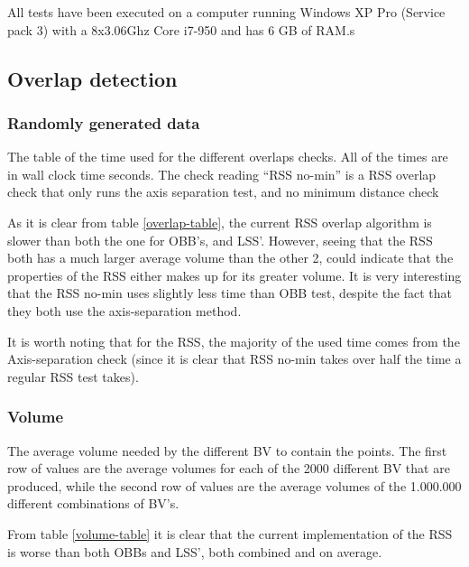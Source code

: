 All tests have been executed on a computer running Windows XP Pro (Service pack 3) with a 8x3.06Ghz Core i7-950 and has 6 GB of RAM.s

\subsection{Overlap detection}

\subsubsection{Randomly generated data}

\begin{table}

\caption{\label{overlap-table}The table of the time used for the
  different overlaps checks. All of the times are in wall clock time seconds. The
  check reading ``RSS no-min'' is a RSS overlap check that only runs the axis separation test, and no minimum distance check}
\end{table}

As it is clear from table \ref{overlap-table}, the current RSS overlap algorithm is slower than both the one for OBB's, and LSS'. However, seeing that the RSS both has a much larger average volume than the other 2, could indicate that the properties of the RSS either makes up for its greater volume. It is very interesting that the RSS no-min uses slightly less time than OBB test, despite the fact that they both use the axis-separation method.

It is worth noting that for the RSS, the majority of the used time comes from the Axis-separation check (since it is clear that RSS no-min takes over half the time a regular RSS test takes).

\subsubsection{Volume}
\begin{table}

\caption{\label{volume-table} The average volume needed by the
  different BV to contain the points. The first row of values are the average
  volumes for each of the 2000 different BV that are produced, while
  the second row of values are the average volumes of the 1.000.000
  different combinations of BV's.}
\end{table}

From table \ref{volume-table} it is clear that the current implementation of the RSS is worse than both OBBs and LSS', both combined and on average.

